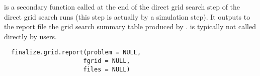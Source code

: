 %
\begin{Description}\relax
{} is a secondary function called at the end of the 
direct grid search step of the direct grid search runs (this step is actually
by a simulation step). It outputs to the report file the grid search summary 
table produced by .  is 
typically not called directly by users.
\end{Description}
%
\begin{Usage}
\begin{verbatim}
  finalize.grid.report(problem = NULL,
                      fgrid = NULL,
                      files = NULL)
\end{verbatim}
\end{Usage}
%
